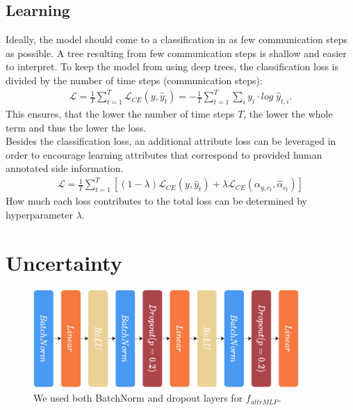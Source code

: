 \documentclass[a4paper,cleardoubleempty,BCOR1cm, 11pt]{report}
\begin{document}
\subsection{Learning}
Ideally, the model should come to a classification in as few communication steps as possible. A tree resulting from few communication steps is shallow and easier to interpret. To keep the model from using deep trees, the classification loss is divided by the number of time steps (communication steps):
\begin{align}
	\mathcal{L} = \frac{1}{T} \sum_{t=1}^{T}\mathcal{L}_{CE}(y, \hat{y}_t) = - \frac{1}{T}\sum_{t=1}^{T}\sum_{i}y_i \cdot log\;\hat{y}_{t,i}.
\end{align}
This ensures, that the lower the number of time steps $T$, the lower the whole term and thus the lower the loss.\\
Besides the classification loss, an additional attribute loss can be leveraged in order to encourage learning attributes that correspond to provided human annotated side information.
\begin{align}
	\mathcal{L} = \frac{1}{T}\sum_{t=1}^{T}\left[(1-\lambda)\mathcal{L}_{CE}(y,\hat{y}_t) + \lambda \mathcal{L}_{CE}(\alpha_{y,c_t},\hat{\alpha}_{c_t}) \right]
\end{align}
How much each loss contributes to the total loss can be determined by hyperparameter $\lambda$.



\section{Uncertainty}

\begin{figure}
	\centering
	\includegraphics[width=0.9\textwidth]{images/f_attrMLP.pdf} 
	\caption{We used both BatchNorm and dropout layers for $f_{attrMLP}$.}
	\label{fig:f_attrMLP}
\end{figure}
\end{document}
